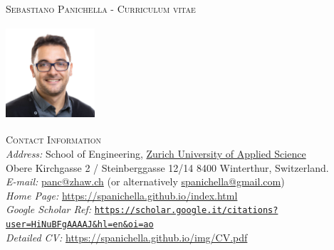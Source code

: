 \documentclass[12pt]{article}
\providecommand*\url[1]{\href{#1}{#1}}
\renewcommand*\url[1]{\href{#1}{\texttt{#1}}}
\providecommand*\email[1]{\href{mailto:#1}{#1}}
\begin{document}
\vspace{-2mm}
\textsc{Sebastiano Panichella - Curriculum vitae}\\
\vspace{-2mm}


\noindent\begin{minipage}{0.3\textwidth}%
\includegraphics[width=3.3cm, height=3.5cm]{images/s_panichella.jpg}
\end{minipage}%
\hfill%
\begin{minipage}{0.9\textwidth}\raggedright
\textsc{Contact Information}\\
{\small
\textit{Address:} School of Engineering,  \href{https://www.zhaw.ch/en/about-us/person/panc/}{Zurich University of Applied Science}\\
Obere Kirchgasse 2 / Steinberggasse 12/14
8400 Winterthur, Switzerland.\\
\textit{E-mail:} \email{panc@zhaw.ch} (or alternatively \email{spanichella@gmail.com})\\
\textit{Home Page:} \href{https://spanichella.github.io/index.html}{https://spanichella.github.io/index.html}\\
\textit{Google Scholar Ref:}  \url{https://scholar.google.it/citations?user=HiNuBFgAAAAJ\&hl=en\&oi=ao}\\
\textit{Detailed CV:} \href{https://spanichella.github.io/img/CV.pdf}{https://spanichella.github.io/img/CV.pdf}}\\
\end{minipage}
\end{document}
